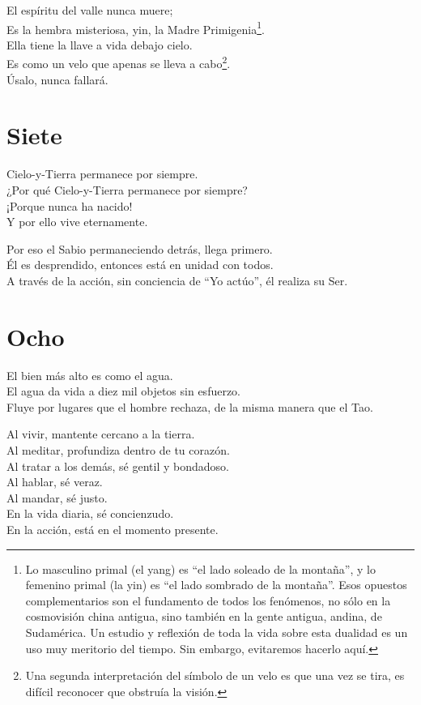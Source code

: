 \documentclass[hidelinks]{memoir}
\begin{document}
	El espíritu del valle nunca muere;\\
	Es la hembra misteriosa, yin, la Madre Primigenia\footnote{Lo masculino primal (el yang) es ``el lado soleado de la montaña'', y lo
		femenino primal (la yin) es ``el lado sombrado de la montaña''. Esos
		opuestos complementarios son el fundamento de todos los fenómenos, no
		sólo en la cosmovisión china antigua, sino también en la gente antigua,
		andina, de Sudamérica. Un estudio y reflexión de toda la vida sobre esta
		dualidad es un uso muy meritorio del tiempo. Sin embargo, evitaremos
		hacerlo aquí.}.\\
	Ella tiene la llave a vida debajo cielo.\\
	Es como un velo que apenas se lleva a cabo\footnote{Una segunda interpretación del símbolo de un velo es que una vez se tira, es difícil reconocer que obstruía la visión.}.\\
	Úsalo, nunca fallará.
	
	\chapter*{Siete}
	
	Cielo-y-Tierra permanece por siempre.\\
	¿Por qué Cielo-y-Tierra permanece por siempre?\\
	¡Porque nunca ha nacido!\\
	Y por ello vive eternamente.
	
	Por eso el Sabio permaneciendo detrás, llega primero.\\
	Él es desprendido, entonces está en unidad con todos.\\
	A través de la acción, sin conciencia de ``Yo actúo'', él realiza su
	Ser.
	
	\chapter*{Ocho}
	
	El bien más alto es como el agua.\\
	El agua da vida a diez mil objetos sin esfuerzo.\\
	Fluye por lugares que el hombre rechaza, de la misma manera que el Tao.
	
	Al vivir, mantente cercano a la tierra.\\
	Al meditar, profundiza dentro de tu corazón.\\
	Al tratar a los demás, sé gentil y bondadoso.\\
	Al hablar, sé veraz.\\
	Al mandar, sé justo.\\
	En la vida diaria, sé concienzudo.\\
	En la acción, está en el momento presente.
	
\end{document}
